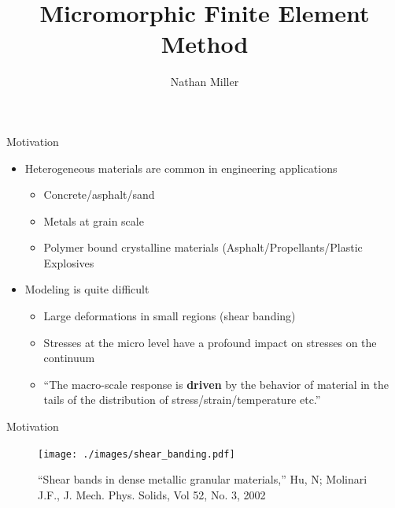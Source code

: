 \documentclass[11pt]{beamer}
\author[N. Miller]{Nathan Miller}
\title{Micromorphic Finite Element Method}
\begin{document}
{

\begin{frame}[noframenumbering]
\titlepage
\end{frame}
}
\begin{frame}{Motivation}

\begin{itemize}
\item {Heterogeneous materials are common in engineering applications
\begin{itemize}
\item Concrete/asphalt/sand
\item Metals at grain scale
\item Polymer bound crystalline materials (Asphalt/Propellants/Plastic Explosives
\end{itemize}
}
\item {Modeling is quite difficult
\begin{itemize}
\item Large deformations in small regions (shear banding)
\item Stresses at the micro level have a profound impact on stresses on the continuum
\item ``The macro-scale response is \textbf{driven} by the behavior of material in the tails of the distribution of stress/strain/temperature etc.''
\end{itemize}
}
\end{itemize}

\end{frame}

\begin{frame}{Motivation}

\begin{figure}
\centering
\texttt{[image: ./images/shear\_banding.pdf]}
\caption{“Shear bands in dense metallic granular materials,” Hu, N; Molinari J.F., J. Mech. Phys. Solids, Vol 52, No. 3, 2002}
\end{figure}

\end{frame}
\end{document}
